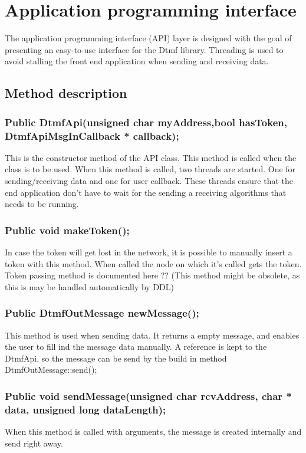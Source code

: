 \section{Application programming interface} %
The application programming interface (API) layer is designed with the goal of presenting an easy-to-use interface for the Dtmf library. Threading is used to avoid stalling the front end application when sending and receiving data. 
\subsection{Method description}
\subsubsection*{Public DtmfApi(unsigned char myAddress,bool hasToken, DtmfApiMsgInCallback * callback);}
This is the constructor method of the API class. This method is called when the class is to be used.
When this method is called, two threads are started. One for sending/receiving data and one for user callback. These threads ensure that the end application don't have to wait for the sending a receiving algorithms that needs to be running.

\subsubsection*{Public void makeToken();}
In case the token will get lost in the network, it is possible to manually insert a token with this method. When called the node on which it's called gets the token. Token passing method is documented here ?? (This method might be obsolete, as this is may be handled automatically by DDL)

\subsubsection*{Public DtmfOutMessage newMessage();}
This method is used when sending data. It returns a empty message, and enables the user to fill ind the message data manually. A reference is kept to the DtmfApi, so the message can be send by the build in method DtmfOutMessage::send();

\subsubsection*{Public void sendMessage(unsigned char rcvAddress, char * data, unsigned long dataLength);}
When this method is called with arguments, the message is created internally and send right away.

